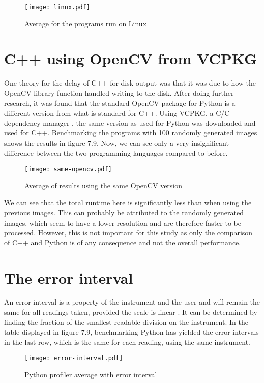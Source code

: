 \begin{figure}[H]
	\centering
	\texttt{[image: linux.pdf]}
	\caption{Average for the programs run on Linux}
	\label{figure:linux}
\end{figure}

\section{C++ using OpenCV from VCPKG}
One theory for the delay of C++ for disk output was that it was due to how the OpenCV library function handled writing to the disk. After doing further research, it was found that the standard OpenCV package for Python is a different version from what is standard for C++. Using VCPKG, a C/C++ dependency manager \cite{vcpkg}, the same version as used for Python was downloaded and used for C++. Benchmarking the programs with 100 randomly generated images shows the results in figure 7.9. Now, we can see only a very insignificant difference between the two programming languages compared to before.

\begin{figure}[H]
	\centering
	\texttt{[image: same-opencv.pdf]}
	\caption{Average of results using the same OpenCV version}
	\label{figure:same-opencv}
\end{figure}

We can see that the total runtime here is significantly less than when using the previous images. This can probably be attributed to the randomly generated images, which seem to have a lower resolution and are therefore faster to be processed. However, this is not important for this study as only the comparison of C++ and Python is of any consequence and not the overall performance.

\section{The error interval}
An error interval is a property of the instrument and the user and will remain the same for all readings taken, provided the scale is linear \cite{errorinterval}. It can be determined by finding the fraction of the smallest readable division on the instrument. In the table displayed in figure 7.9, benchmarking Python has yielded the error intervals in the last row, which is the same for each reading, using the same instrument.

\begin{figure}[H]
	\centering
	\texttt{[image: error-interval.pdf]}
	\caption{Python profiler average with error interval}
	\label{figure:error-interval}
\end{figure}

